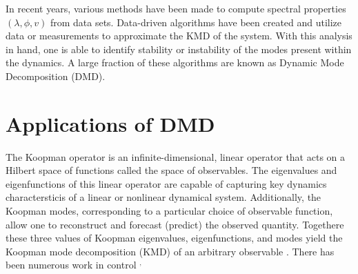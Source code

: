 \documentclass{article}
\begin{document}
In recent years, various methods have been made to compute spectral properties $(\lambda,\phi,v)$ from data sets. Data-driven algorithms have been created and utilize data or measurements to approximate the KMD of the system. With this analysis in hand, one is able to identify stability or instability of the modes present within the dynamics. A large fraction of these algorithms are known as Dynamic Mode Decomposition (DMD). 

\newpage
\section*{Applications of DMD}
The Koopman operator is an infinite-dimensional, linear operator that acts on a Hilbert space of functions called the space of observables. The eigenvalues and eigenfunctions of this linear operator are capable of capturing key dynamics charactersticis of a linear or nonlinear dynamical system. Additionally, the Koopman modes, corresponding to a particular choice of observable function, allow one to reconstruct and forecast (predict) the observed quantity. Togethere these three values of Koopman eigenvalues, eigenfunctions, and modes yield the Koopman mode decomposition (KMD) of an arbitrary observable \autocite[4]{arbabi2017study}. There has been numerous work in control \autocite[5]{arbabi2018data}$^{,}$\autocite[6]{KORDA2018149}\
\end{document}
